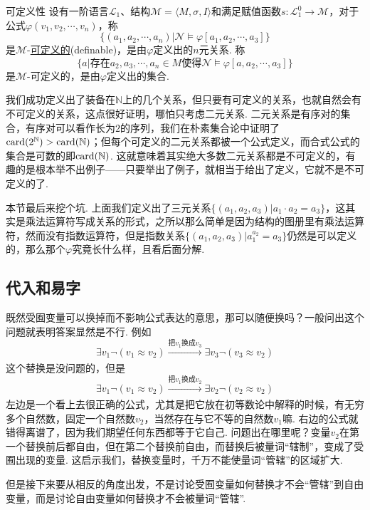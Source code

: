 \documentclass[main.tex]{subfiles}
\begin{document}
\begin{definition}{可定义性}
    设有一阶语言\(\mathcal{L}_1\)、结构\(\mathcal{M}=\langle M,\sigma,I \rangle\)和满足赋值函数\(s:\mathcal{L}_1^0 \to \mathcal{M}\)，对于公式\(\varphi(v_1,v_2, \cdots,v_n)\)，称
    \[\{(a_1,a_2,\cdots,a_n)|\mathcal{N} \vDash \varphi[a_1,a_2,\cdots,a_3]\}\]
    是\(\mathcal{M}\)-\uline{可定义的}(definable)，是由\(\varphi\)定义出的\(n\)元关系. 称
    \[\{a|\mbox{存在}a_2,a_3,\cdots,a_n \in M\mbox{使得}\mathcal{N} \vDash \varphi[a,a_2,\cdots,a_3]\}\]
    是\(\mathcal{M}\)-可定义的，是由\(\varphi\)定义出的集合. 
\end{definition}

我们成功定义出了装备在\(\mathbb{N}\)上的几个关系，但只要有可定义的关系，也就自然会有不可定义的关系，这点很好证明，哪怕只考虑二元关系. 二元关系是有序对的集合，有序对可以看作长为\(2\)的序列，我们在朴素集合论中证明了\({\rm card}(2^\mathbb{N})>{\rm card}(\mathbb{N})\)；但每个可定义的二元关系都被一个公式定义，而合式公式的集合是可数的即\({\rm card}(\mathbb{N})\). 这就意味着其实绝大多数二元关系都是不可定义的，有趣的是根本举不出例子——只要举出了例子，就相当于给出了定义，它就不是不可定义的了.

本节最后来挖个坑. 上面我们定义出了三元关系\(\{(a_1,a_2,a_3)|a_1 \cdot a_2 = a_3\}\)，这其实是乘法运算符写成关系的形式，之所以那么简单是因为结构的图册里有乘法运算符，然而没有指数运算符，但是指数关系\(\{(a_1,a_2,a_3)|a_1^{a_2} = a_3\}\)仍然是可以定义的，那么那个\(\varphi\)究竟长什么样，且看后面分解.

\subsection{代入和易字}

既然受囿变量可以换掉而不影响公式表达的意思，那可以随便换吗？一般问出这个问题就表明答案显然是不行. 例如
\[\exists v_1 \neg(v_1 \approx v_2) \xrightarrow[]{\mbox{把}v_1\mbox{换成}v_3} \exists v_3 \neg (v_3 \approx v_2)\]
这个替换是没问题的，但是
\[\exists v_1 \neg(v_1 \approx v_2) \xrightarrow[]{\mbox{把}v_1\mbox{换成}v_2} \exists v_2 \neg (v_2 \approx v_2)\]
左边是一个看上去很正确的公式，尤其是把它放在初等数论中解释的时候，有无穷多个自然数，固定一个自然数\(v_2\)，当然存在与它不等的自然数\(v_1\)嘛. 右边的公式就错得离谱了，因为我们期望任何东西都等于它自己. 问题出在哪里呢？变量\(v_2\)在第一个替换前后都自由，但在第二个替换前自由，而替换后被量词“辖制”，变成了受囿出现的变量. 
这启示我们，替换变量时，千万不能使量词“管辖”的区域扩大.

但是接下来要从相反的角度出发，不是讨论受囿变量如何替换才不会“管辖”到自由变量，而是讨论自由变量如何替换才不会被量词“管辖”.
\end{document}

